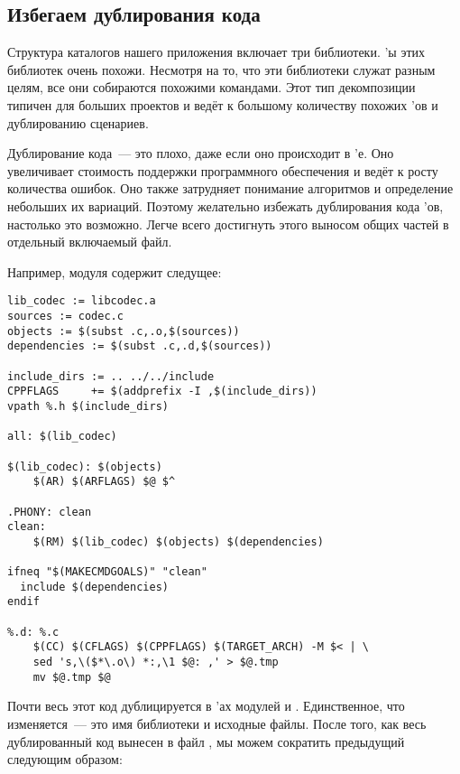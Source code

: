 \subsection{Избегаем дублирования кода}

Структура каталогов нашего приложения включает три
библиотеки. \Makefile{}'ы этих библиотек очень похожи. Несмотря на то,
что эти библиотеки служат разным целям, все они собираются похожими
командами. Этот тип декомпозиции типичен для больших проектов и ведёт
к большому количеству похожих \Makefile{}'ов и дублированию сценариев.

Дублирование кода~--- это плохо, даже если оно происходит в
\Makefile{}'е. Оно увеличивает стоимость поддержки программного
обеспечения и ведёт к росту количества ошибок. Оно также затрудняет
понимание алгоритмов и определение небольших их вариаций. Поэтому
желательно избежать дублирования кода \Makefile{}'ов, настолько это
возможно. Легче всего достигнуть этого выносом общих частей в
отдельный включаемый файл.

Например, \Makefile{} модуля  содержит следущее:

{\footnotesize
\begin{verbatim}
lib_codec := libcodec.a
sources := codec.c
objects := $(subst .c,.o,$(sources))
dependencies := $(subst .c,.d,$(sources))

include_dirs := .. ../../include
CPPFLAGS     += $(addprefix -I ,$(include_dirs))
vpath %.h $(include_dirs)

all: $(lib_codec)

$(lib_codec): $(objects)
    $(AR) $(ARFLAGS) $@ $^

.PHONY: clean
clean:
    $(RM) $(lib_codec) $(objects) $(dependencies)

ifneq "$(MAKECMDGOALS)" "clean"
  include $(dependencies)
endif

%.d: %.c
    $(CC) $(CFLAGS) $(CPPFLAGS) $(TARGET_ARCH) -M $< | \
    sed 's,\($*\.o\) *:,\1 $@: ,' > $@.tmp
    mv $@.tmp $@
\end{verbatim}
}

Почти весь этот код дублицируется в \Makefile{}'ах модулей
 и . Единственное, что изменяется~--- это
имя библиотеки и исходные файлы. После того, как весь дублированный
код вынесен в файл \filename{common.mk}, мы можем сократить предыдущий
\Makefile{} следующим образом:

